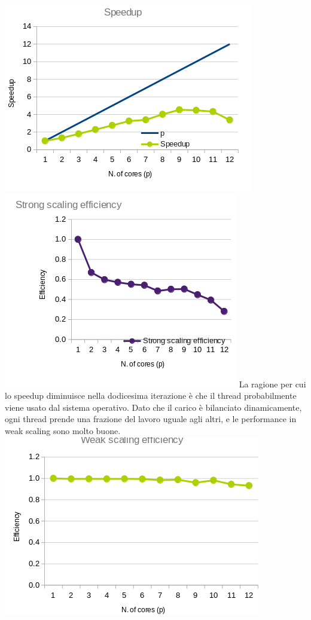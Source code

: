 \documentclass[a4paper,11pt, twoside]{report}
\begin{document}
\newline
\includegraphics[scale=0.5]{images/omp_speedup.png}
\includegraphics[scale=0.5]{images/omp_strong.png}
La ragione per cui lo speedup diminuisce nella dodicesima iterazione è che il thread probabilmente viene usato dal sistema operativo.
Dato che il carico è bilanciato dinamicamente, ogni thread prende una frazione del lavoro uguale agli altri, 
e le performance in weak scaling sono molto buone.
\includegraphics[scale=0.5]{images/omp_weak.png}
\end{document}
